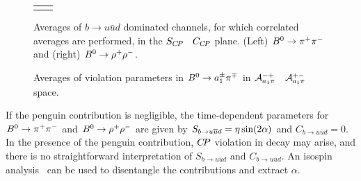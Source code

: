\begin{figure}[htbp]
\begin{center}
\begin{tabular}{cc}
{      }
    \end{tabular}
  \end{center}
  \vspace{-0.8cm}
  \caption{
    Averages of $b \to u\bar u d$ dominated channels,
    for which correlated averages are performed,
    in the $S_{C\!P}$ \vs\ $C_{C\!P}$ plane.
    (Left) $B^0 \to \pi^+\pi^-$ and (right) $B^0 \to \rho^+\rho^-$.
  }
  \label{fig:cp_uta:uud_SvsC}
\end{figure}

\begin{figure}[htbp]
  \begin{center}
    \vspace{-0.3cm}
    \caption{
      Averages of \CP violation parameters in $B^0 \to a_1^\pm\pi^\mp$ in
      ${\cal A}^{-+}_{a_1\pi}$ \vs\ ${\cal A}^{+-}_{a_1\pi}$ space.
    }
    \label{fig:cp_uta:a1pi}
  \end{center}
\end{figure}

If the penguin contribution is negligible, 
the time-dependent parameters for $B^0 \to \pi^+\pi^-$ 
and $B^0 \to \rho^+\rho^-$ are given by
$S_{b \to u\bar u d} = \etacp \sin(2\alpha)$ and
$C_{b \to u\bar u d} = 0$.
In the presence of the penguin contribution, 
$C\!P$ violation in decay may arise, 
and there is no straightforward interpretation 
of $S_{b \to u\bar u d}$ and $C_{b \to u\bar u d}$.
An isospin analysis~\cite{Gronau:1990ka} 
can be used to disentangle the contributions and extract $\alpha$.

